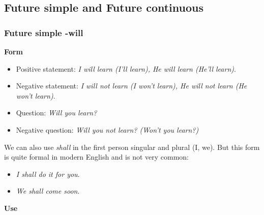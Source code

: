 \subsection{Future simple and Future continuous}

\subsubsection{Future simple -will}

\textbf{Form} 
 
\begin{itemize}

\item Positive statement: \textit{I will learn (I'll learn), He will learn (He'll learn)}.
\item Negative statement: \textit{I will not learn (I won't learn), He will not learn (He won't learn)}.
\item Question: \textit{Will you learn?}
\item Negative question: \textit{Will you not learn? (Won't you learn?)}

\end{itemize}

We can also use \textit{shall} in the first person singular and plural (I, we). But this form is quite formal in modern English and is not very common:

\begin{itemize}
\item \textit{I shall do it for you}.
\item \textit{We shall come soon}.
\end{itemize}

\textbf{Use}

